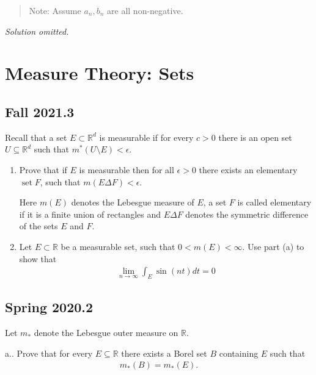 \begin{quote}
Note: Assume \(a_n, b_n\) are all non-negative.
\end{quote}


\emph{Solution omitted.}

\hypertarget{measure-theory-sets}{%
\section{Measure Theory: Sets}\label{measure-theory-sets}}

\hypertarget{fall-2021.3}{%
\subsection{Fall 2021.3}\label{fall-2021.3}}

Recall that a set \(E \subset \mathbb{R}^{d}\) is measurable if for
every \(c>0\) there is an open set \(U \subseteq {\mathbb{R}}^d\) such
that \(m^{*}(U \setminus E)<\epsilon\).

\begin{enumerate}
\def\labelenumi{\alph{enumi}.}
\item
  Prove that if \(E\) is measurable then for all \(\epsilon>0\) there
  exists an elementary \(\operatorname{set} F\), such that
  \(m(E \Delta F)<\epsilon\).

  Here \(m(E)\) denotes the Lebesgue measure of \(E\), a set \(F\) is
  called elementary if it is a finite union of rectangles and
  \(E \Delta F\) denotes the symmetric difference of the sets \(E\) and
  \(F\).
\item
  Let \(E \subset \mathbb{R}\) be a measurable set, such that
  \(0<m(E)<\infty\). Use part (a) to show that
  \begin{align*}
  \lim _{n \rightarrow \infty} \int_{E} \sin (n t) d t=0
  \end{align*}
\end{enumerate}

\hypertarget{spring-2020.2}{%
\subsection{Spring 2020.2}\label{spring-2020.2}}

Let \(m_*\) denote the Lebesgue outer measure on \({\mathbb{R}}\).

a.. Prove that for every \(E\subseteq {\mathbb{R}}\) there exists a
Borel set \(B\) containing \(E\) such that
\begin{align*}
m_*(B) = m_*(E)
.\end{align*}

